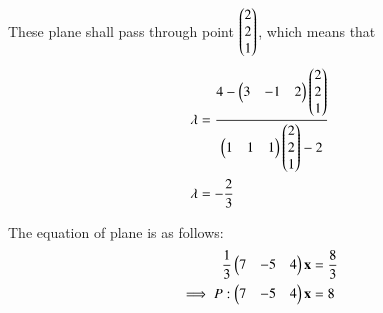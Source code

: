 \documentclass[journal,12pt,twocolumn]{IEEEtran}
\renewcommand{\vec}[1]{\boldsymbol{\mathbf{#1}}}
\begin{document}
These plane shall pass through point $\begin{pmatrix}2\\2\\1\end{pmatrix}$, which means that
\begin{align}
    \lambda &= \frac{4 - \begin{pmatrix}3&-1&2\end{pmatrix}{\ensuremath{\begin{pmatrix}2\\2\\1\end{pmatrix}}}}{\begin{pmatrix}1&1&1\end{pmatrix}{\ensuremath{\begin{pmatrix}2\\2\\1\end{pmatrix}}} - 2} \\
    \lambda &= -\frac{2}{3}
\end{align}

The equation of plane is as follows:
\begin{align}
    \frac{1}{3}\myvec{7&-5&4}\vec{x} &= \frac{8}{3}\\
    \implies {P}: \myvec{7&-5&4}\vec{x} &= 8
\end{align}
\end{document}
